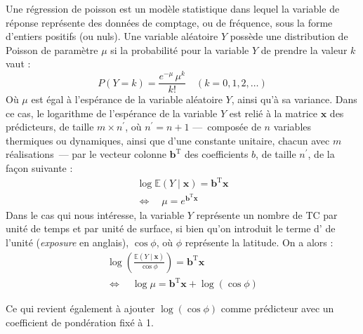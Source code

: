 \documentclass[../main.tex]{subfiles}
\begin{document}
Une régression de poisson est un modèle statistique dans lequel la variable de réponse représente des données de comptage, ou de fréquence, sous la forme
d'entiers positifs (ou nuls). Une variable aléatoire $Y$ possède une distribution de Poisson de paramètre $\mu$ si la probabilité pour la variable $Y$
de prendre la valeur $k$ vaut :
%
\begin{equation*}
    P(Y = k) = \frac{e^{-\mu} \, \mu^k}{k!} \quad (k=0, 1, 2, \ldots) 
\end{equation*}
%
Où $\mu$ est égal à l'espérance de la variable aléatoire $Y$, ainsi qu'à sa variance. Dans ce cas, le logarithme de l'espérance de la variable $Y$ est relié
à la matrice $\mathbf{x}$ des prédicteurs, de taille $m \times n^\prime$, où $n^\prime = n + 1$ ---~composée de $n$ variables thermiques ou dynamiques, ainsi que
d'une constante unitaire, chacun avec $m$ réalisations~--- par le vecteur colonne $\mathbf{b}^{\mathrm{T}}$ des coefficients $b$, de taille $n^\prime$, de la
façon suivante :
%
\begin{gather*}
    \log \mathbb{E} \left( Y \mid \mathbf{x} \right ) = \mathbf{b}^{\mathrm{T}} \mathbf{x} \\
    \Leftrightarrow \quad \mu = e^{\mathbf{b}^{\mathrm{T}} \mathbf{x}}
\end{gather*}
%
Dans le cas qui nous intéresse, la variable $Y$ représente un nombre de TC par unité de temps et par unité de surface, si bien qu'on introduit le terme
d' de l'unité (\textit{exposure} en anglais), $\cos \phi$, où $\phi$ représente la latitude. On a alors :
%
\begin{equation}
    \begin{gathered}\label{eq:poisson_reg}
        \log \left( \frac{\mathbb{E} \left( Y \mid \mathbf{x}\right )}{\cos \phi} \right) = \mathbf{b}^{\mathrm{T}} \mathbf{x} \\
        \Leftrightarrow \quad \log \mu = \mathbf{b}^{\mathrm{T}} \mathbf{x} + \log (\cos \phi)
    \end{gathered}
\end{equation}

%
Ce qui revient également à ajouter $\log (\cos \phi)$ comme prédicteur avec un coefficient de pondération fixé à 1.
\end{document}
